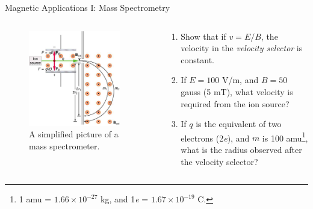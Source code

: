 \documentclass{beamer}
\begin{document}
\begin{frame}{Magnetic Applications I: Mass Spectrometry}
\begin{columns}[T]
\begin{column}{0.5\textwidth}
\begin{figure}
\centering
\includegraphics[width=0.9\textwidth]{figures/mass_spec.jpeg}
\caption{\label{fig:mass2} A simplified picture of a mass spectrometer.}
\end{figure}
\end{column}
\begin{column}{0.5\textwidth}
\small
\begin{enumerate}
\item Show that if $v = E/B$, the velocity in the \textit{velocity selector} is constant.
\item If $E = 100$ V/m, and $B = 50$ gauss (5 mT), what velocity is required from the ion source?
\item If $q$ is the equivalent of two electrons (2\textit{e}), and $m$ is 100 amu\footnote{1 amu = $1.66 \times 10^{-27}$ kg, and 1\textit{e} = $1.67 \times 10^{-19}$ C.}, what is the radius observed after the velocity selector?
\end{enumerate}
\end{column}
\end{columns}
\end{frame}
\end{document}
